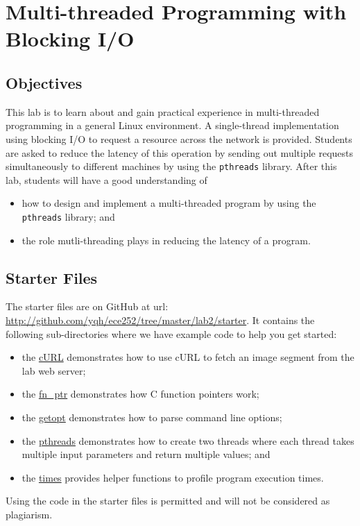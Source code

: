 \chapter{Multi-threaded Programming with Blocking I/O}
\label{ch2_pthreads}

\section{Objectives}
This lab is to learn about and gain practical experience in multi-threaded programming in a general Linux environment. A single-thread implementation using blocking I/O to request a resource across the network is provided. Students are asked to reduce the latency of this operation by sending out multiple requests simultaneously to different machines by using the \verb+pthreads+ library. After this lab, students will have a good understanding of
\begin{itemize}
  \item  how to design and implement a multi-threaded program by using the \verb+pthreads+ library; and
  \item  the role mutli-threading plays in reducing the latency of a program.
\end{itemize}

\section{Starter Files}
The starter files are on GitHub at url: \url{http://github.com/yqh/ece252/tree/master/lab2/starter}.
It contains the following sub-directories where we have example code to help you get started:
\begin{itemize}
    \item the \href{http://github.com/yqh/ece252/tree/master/lab2/starter/cURL}{cURL} demonstrates how to use cURL to fetch an image segment from the lab web server;
    \item the \href{http://github.com/yqh/ece252/tree/master/lab2/starter/fn_ptr}{fn\_ptr} demonstrates how C function pointers work; 
    \item the \href{http://github.com/yqh/ece252/tree/master/lab2/starter/getopt}{getopt} demonstrates how to parse command line options;
    \item the \href{http://github.com/yqh/ece252/tree/master/lab2/starter/pthreads}{pthreads} demonstrates how to create two threads where each thread takes multiple input parameters and return multiple values; and
    \item the \href{http://github.com/yqh/ece252/tree/master/lab2/starter/times}{times} provides helper functions to profile program execution times.
\end{itemize}
Using the code in the starter files is permitted and will not be considered as plagiarism.

